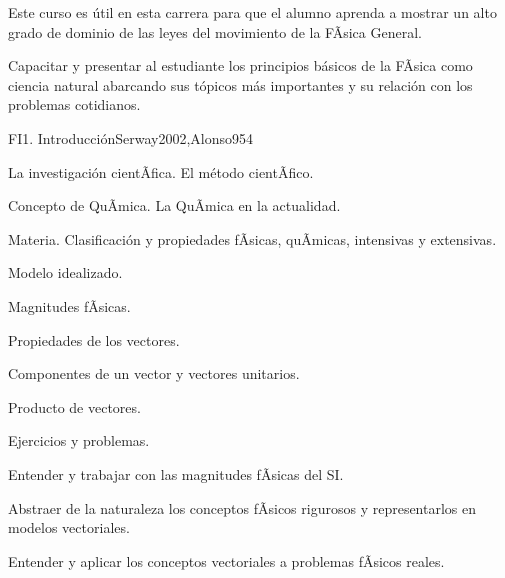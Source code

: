 \begin{syllabus}


\begin{justification}
Este curso es útil en esta carrera para que el alumno aprenda a mostrar un alto grado de dominio de las leyes del movimiento de la FÃ­sica General.
\end{justification}

\begin{goals}
\item Capacitar y presentar al estudiante los principios básicos de la FÃ­sica como ciencia natural abarcando sus tópicos más importantes y su relación con los problemas cotidianos.
\end{goals}

\begin{outcomes}
\end{outcomes}

\begin{unit}{FI1. Introducción}{Serway2002,Alonso95}{4}
\begin{topics}
      \item La investigación cientÃ­fica. El método cientÃ­fico.
      \item Concepto de QuÃ­mica. La QuÃ­mica en la actualidad.
      \item Materia. Clasificación y propiedades fÃ­sicas, quÃ­micas, intensivas y extensivas.
      \item Modelo idealizado.
      \item Magnitudes fÃ­sicas.
      \item Propiedades de los vectores.
      \item Componentes de un vector y vectores unitarios.
      \item Producto de vectores.
      \item Ejercicios y problemas.
   \end{topics}

   \begin{unitgoals}
      \item Entender y trabajar con las magnitudes fÃ­sicas del SI.
      \item Abstraer de la naturaleza los conceptos fÃ­sicos rigurosos y
      representarlos en modelos vectoriales.
      \item Entender y aplicar los conceptos vectoriales a problemas fÃ­sicos reales.
   \end{unitgoals}
\end{unit}


\end{syllabus}

